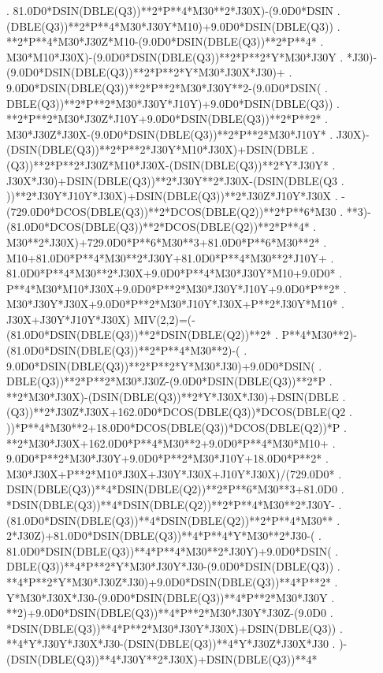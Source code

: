\begin{framedverbatim}
     . 81.0D0*DSIN(DBLE(Q3))**2*P**4*M30**2*J30X)-(9.0D0*DSIN
     . (DBLE(Q3))**2*P**4*M30*J30Y*M10)+9.0D0*DSIN(DBLE(Q3))
     . **2*P**4*M30*J30Z*M10-(9.0D0*DSIN(DBLE(Q3))**2*P**4*
     . M30*M10*J30X)-(9.0D0*DSIN(DBLE(Q3))**2*P**2*Y*M30*J30Y
     . *J30)-(9.0D0*DSIN(DBLE(Q3))**2*P**2*Y*M30*J30X*J30)+
     . 9.0D0*DSIN(DBLE(Q3))**2*P**2*M30*J30Y**2-(9.0D0*DSIN(
     . DBLE(Q3))**2*P**2*M30*J30Y*J10Y)+9.0D0*DSIN(DBLE(Q3))
     . **2*P**2*M30*J30Z*J10Y+9.0D0*DSIN(DBLE(Q3))**2*P**2*
     . M30*J30Z*J30X-(9.0D0*DSIN(DBLE(Q3))**2*P**2*M30*J10Y*
     . J30X)-(DSIN(DBLE(Q3))**2*P**2*J30Y*M10*J30X)+DSIN(DBLE
     . (Q3))**2*P**2*J30Z*M10*J30X-(DSIN(DBLE(Q3))**2*Y*J30Y*
     . J30X*J30)+DSIN(DBLE(Q3))**2*J30Y**2*J30X-(DSIN(DBLE(Q3
     . ))**2*J30Y*J10Y*J30X)+DSIN(DBLE(Q3))**2*J30Z*J10Y*J30X
     . -(729.0D0*DCOS(DBLE(Q3))**2*DCOS(DBLE(Q2))**2*P**6*M30
     . **3)-(81.0D0*DCOS(DBLE(Q3))**2*DCOS(DBLE(Q2))**2*P**4*
     . M30**2*J30X)+729.0D0*P**6*M30**3+81.0D0*P**6*M30**2*
     . M10+81.0D0*P**4*M30**2*J30Y+81.0D0*P**4*M30**2*J10Y+
     . 81.0D0*P**4*M30**2*J30X+9.0D0*P**4*M30*J30Y*M10+9.0D0*
     . P**4*M30*M10*J30X+9.0D0*P**2*M30*J30Y*J10Y+9.0D0*P**2*
     . M30*J30Y*J30X+9.0D0*P**2*M30*J10Y*J30X+P**2*J30Y*M10*
     . J30X+J30Y*J10Y*J30X)
      MIV(2,2)=(-(81.0D0*DSIN(DBLE(Q3))**2*DSIN(DBLE(Q2))**2*
     . P**4*M30**2)-(81.0D0*DSIN(DBLE(Q3))**2*P**4*M30**2)-(
     . 9.0D0*DSIN(DBLE(Q3))**2*P**2*Y*M30*J30)+9.0D0*DSIN(
     . DBLE(Q3))**2*P**2*M30*J30Z-(9.0D0*DSIN(DBLE(Q3))**2*P
     . **2*M30*J30X)-(DSIN(DBLE(Q3))**2*Y*J30X*J30)+DSIN(DBLE
     . (Q3))**2*J30Z*J30X+162.0D0*DCOS(DBLE(Q3))*DCOS(DBLE(Q2
     . ))*P**4*M30**2+18.0D0*DCOS(DBLE(Q3))*DCOS(DBLE(Q2))*P
     . **2*M30*J30X+162.0D0*P**4*M30**2+9.0D0*P**4*M30*M10+
     . 9.0D0*P**2*M30*J30Y+9.0D0*P**2*M30*J10Y+18.0D0*P**2*
     . M30*J30X+P**2*M10*J30X+J30Y*J30X+J10Y*J30X)/(729.0D0*
     . DSIN(DBLE(Q3))**4*DSIN(DBLE(Q2))**2*P**6*M30**3+81.0D0
     . *DSIN(DBLE(Q3))**4*DSIN(DBLE(Q2))**2*P**4*M30**2*J30Y-
     . (81.0D0*DSIN(DBLE(Q3))**4*DSIN(DBLE(Q2))**2*P**4*M30**
     . 2*J30Z)+81.0D0*DSIN(DBLE(Q3))**4*P**4*Y*M30**2*J30-(
     . 81.0D0*DSIN(DBLE(Q3))**4*P**4*M30**2*J30Y)+9.0D0*DSIN(
     . DBLE(Q3))**4*P**2*Y*M30*J30Y*J30-(9.0D0*DSIN(DBLE(Q3))
     . **4*P**2*Y*M30*J30Z*J30)+9.0D0*DSIN(DBLE(Q3))**4*P**2*
     . Y*M30*J30X*J30-(9.0D0*DSIN(DBLE(Q3))**4*P**2*M30*J30Y
     . **2)+9.0D0*DSIN(DBLE(Q3))**4*P**2*M30*J30Y*J30Z-(9.0D0
     . *DSIN(DBLE(Q3))**4*P**2*M30*J30Y*J30X)+DSIN(DBLE(Q3))
     . **4*Y*J30Y*J30X*J30-(DSIN(DBLE(Q3))**4*Y*J30Z*J30X*J30
     . )-(DSIN(DBLE(Q3))**4*J30Y**2*J30X)+DSIN(DBLE(Q3))**4*

\end{framedverbatim}
